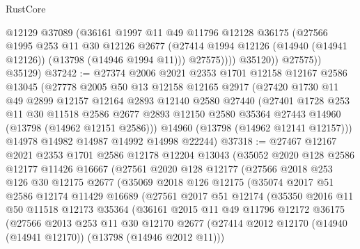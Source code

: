 \begin{lexlean}{RustCore}
\begin{coremodule}
                  @12129
                  @37089
                  (@36161
                    @1997
                    @11
                    @49
                    @11796
                    @12128
                    @36175
                    (@27566
                      @1995
                      @253
                      @11
                      @30
                      @12126
                      @2677
                      (@27414 @1994 @12126 (@14940 (@14941 @12126)) (@13798 (@14946 @1994 @11)))
                      @27575))))
              @35120))
          @27575))
      @35129)
@37242 := @27374
    @2006
    @2021
    @2353
    @1701
    @12158
    @12167
    @2586
    @13045
    (@27778
      @2005
      @50
      @13
      @12158
      @12165
      @2917
      (@27420
        @1730
        @11
        @49
        @2899
        @12157
        @12164
        @2893
        @12140
        @2580
        @27440
        (@27401
          @1728
          @253
          @11
          @30
          @11518
          @2586
          @2677
          @2893
          @12150
          @2580
          @35364
          @27443
          @14960
          (@13798 (@14962 @12151 @2586)))
        @14960
        (@13798 (@14962 @12141 @12157)))
      @14978
      @14982
      @14987
      @14992
      @14998
      @22244)
@37318 := @27467
    @12167
    @2021
    @2353
    @1701
    @2586
    @12178
    @12204
    @13043
    (@35052
      @2020
      @128
      @2586
      @12177
      @11426
      @16667
      (@27561
        @2020
        @128
        @12177
        (@27566
          @2018
          @253
          @126
          @30
          @12175
          @2677
          (@35069
            @2018
            @126
            @12175
            (@35074
              @2017
              @51
              @2586
              @12174
              @11429
              @16689
              (@27561
                @2017
                @51
                @12174
                (@35350
                  @2016
                  @11
                  @50
                  @11518
                  @12173
                  @35364
                  (@36161
                    @2015
                    @11
                    @49
                    @11796
                    @12172
                    @36175
                    (@27566
                      @2013
                      @253
                      @11
                      @30
                      @12170
                      @2677
                      (@27414 @2012 @12170 (@14940 (@14941 @12170)) (@13798 (@14946 @2012 @11)))

\end{coremodule}
\end{lexlean}
